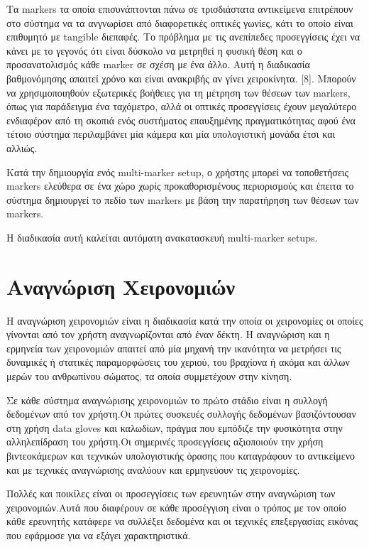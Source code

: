 Τα markers τα οποία επισυνάπτονται πάνω σε τρισδιάστατα αντικείμενα επιτρέπουν στο σύστημα να τα ανγνωρίσει από διαφορετικές οπτικές γωνίες, κάτι το οποίο είναι επιθυμητό με tangible διεπαφές.
Το πρόβλημα με τις ανεπίπεδες προσεγγίσεις έχει να κάνει με το γεγονός ότι είναι δύσκολο να μετρηθεί η φυσική θέση και ο προσανατολισμός κάθε marker σε σχέση με ένα άλλο.
Αυτή η διαδικασία βαθμονόμησης απαιτεί χρόνο και είναι ανακριβής αν γίνει χειροκίνητα. [8]. Μπορούν να χρησιμοποιηθούν εξωτερικές βοήθειες για τη μέτρηση των θέσεων των markers, όπως για παράδειγμα ένα ταχόμετρο, αλλά οι οπτικές προσεγγίσεις έχουν μεγαλύτερο ενδιαφέρον από τη σκοπιά ενός συστήματος επαυξημένης πραγματικότητας αφού ένα τέτοιο σύστημα περιλαμβάνει μία κάμερα και μία υπολογιστική μονάδα έτσι και αλλιώς.

Κατά την δημιουργία ενός multi-marker setup, ο χρήστης μπορεί να τοποθετήσεις markers ελεύθερα σε ένα χώρο χωρίς προκαθορισμένους περιορισμούς και έπειτα το σύστημα δημιουργεί το πεδίο των markers με βάση την παρατήρηση των θέσεων των markers.

Η διαδικασία αυτή καλείται αυτόματη ανακατασκευή multi-marker setups.




\section{Αναγνώριση Χειρονομιών}



H αναγνώριση χειρονομιών είναι η διαδικασία κατά την οποία οι χειρονομίες οι οποίες γίνονται από τον χρήστη αναγνωρίζονται από έναν δέκτη. Η αναγνώριση και η ερμηνεία των χειρονομιών απαιτεί από μία μηχανή την ικανότητα να μετρήσει τις δυναμικές ή στατικές παραμορφώσεις του χεριού, του βραχίονα ή ακόμα και άλλων μερών του ανθρωπίνου σώματος, τα οποία συμμετέχουν στην κίνηση.

Σε κάθε σύστημα αναγνώρισης χειρονομιών το πρώτο στάδιο είναι η συλλογή δεδομένων από τον χρήστη.Οι πρώτες συσκευές συλλογής δεδομένων βασιζόντουσαν στη χρήση data gloves και καλωδίων, πράγμα που εμπόδιζε την φυσικότητα στην αλληλεπίδραση του χρήστη.Οι σημερινές προσεγγίσεις αξιοποιούν την χρήση βιντεοκάμερων και τεχνικών υπολογιστικής όρασης που καταγράφουν το αντικείμενο και με τεχνικές αναγνώρισης αναλύουν και ερμηνεύουν τις χειρονομίες.

Πολλές και ποικίλες είναι οι προσεγγίσεις των ερευνητών στην αναγνώριση των χειρονομιών.Αυτά που διαφέρουν σε κάθε προσέγγιση είναι ο τρόπος με τον οποίο κάθε ερευνητής κατάφερε να συλλέξει δεδομένα και οι τεχνικές επεξεργασίας εικόνας που εφάρμοσε για να εξάγει χαρακτηριστικά.

